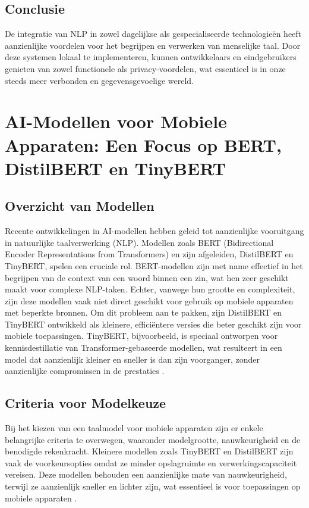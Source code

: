 \subsection{Conclusie}

De integratie van NLP in zowel dagelijkse als gespecialiseerde technologieën heeft aanzienlijke voordelen voor het begrijpen en verwerken van menselijke taal. Door deze systemen lokaal te implementeren, kunnen ontwikkelaars en eindgebruikers genieten van zowel functionele als privacy-voordelen, wat essentieel is in onze s\-t\-ee\-ds meer verbonden en gegevensgevoelige wereld.

\section{AI-Modellen voor Mobiele Apparaten: Een Focus op BERT, DistilBERT en TinyBERT}

\subsection{Overzicht van Modellen}

Recente ontwikkelingen in AI-modellen hebben geleid tot aanzienlijke vooruitgang in natuurlijke taalverwerking (NLP). Modellen zoals BERT (Bidirectional Encoder Representations from Transformers) en zijn afgeleiden, DistilBERT en TinyBERT, spelen een cruciale rol. BERT-modellen zijn met name effectief in het begrijpen van de context van een woord binnen een zin, wat hen zeer geschikt maakt voor complexe NLP-taken. Echter, vanwege hun grootte en complexiteit, zijn deze modellen vaak niet direct geschikt voor gebruik op mobiele apparaten met beperkte bronnen. Om dit probleem aan te pakken, zijn DistilBERT en TinyBERT ontwikkeld als kleinere, efficiëntere versies die beter geschikt zijn voor mobiele toepassingen. TinyBERT, bijvoorbeeld, is speciaal ontworpen voor kennisdestillatie van Transformer-gebaseerde modellen, wat resulteert in een model dat aanzienlijk kleiner en sneller is dan zijn voorganger, zonder aanzienlijke compromissen in de prestaties \autocite{Jiao2019TinyBERT}.

\subsection{Criteria voor Modelkeuze}

Bij het kiezen van een taalmodel voor mobiele apparaten zijn er enkele belangrijke criteria te overwegen, waaronder modelgrootte, nauwkeurigheid en de benodigde rekenkracht. Kleinere modellen zoals TinyBERT en DistilBERT zijn vaak de voorkeursopties omdat ze minder opslagruimte en verwerkingscapaciteit vereisen. Deze modellen behouden een aanzienlijke mate van nauwkeurigheid, terwijl ze aanzienlijk sneller en lichter zijn, wat essentieel is voor toepassingen op mobiele apparaten \autocite{Sun2020MobileBERT}.

